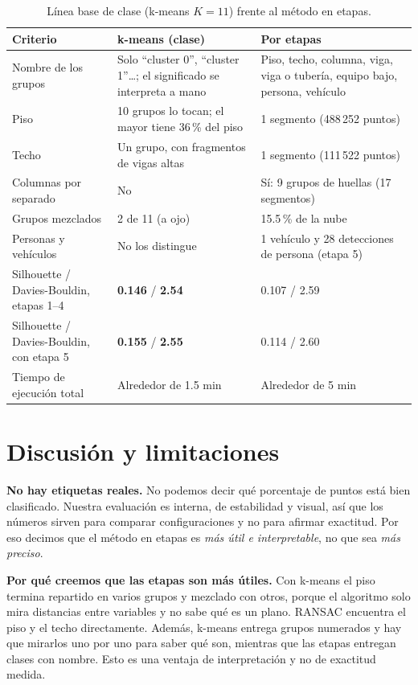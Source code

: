 \documentclass[10pt,a4paper]{article}
\begin{document}
\begin{table}[H]
\centering
\caption{Línea base de clase (k-means $K=11$) frente al método en etapas.}
\label{tab:comp}
\small
\begin{tabular}{p{3.6cm}p{5.4cm}p{5.4cm}}
\toprule
Criterio & k-means (clase) & Por etapas \\
\midrule
Nombre de los grupos & Solo ``cluster 0'', ``cluster 1''\ldots; el significado se interpreta a mano & Piso, techo, columna, viga, viga o tubería, equipo bajo, persona, vehículo \\
Piso & 10 grupos lo tocan; el mayor tiene 36\,\% del piso & 1 segmento (488\,252 puntos) \\
Techo & Un grupo, con fragmentos de vigas altas & 1 segmento (111\,522 puntos) \\
Columnas por separado & No & Sí: 9 grupos de huellas (17 segmentos) \\
Grupos mezclados & 2 de 11 (a ojo) & 15.5\,\% de la nube \\
Personas y vehículos & No los distingue & 1 vehículo y 28 detecciones de persona (etapa 5) \\
Silhouette / Davies-Bouldin, etapas 1--4 & \textbf{0.146} / \textbf{2.54} & 0.107 / 2.59 \\
Silhouette / Davies-Bouldin, con etapa 5 & \textbf{0.155} / \textbf{2.55} & 0.114 / 2.60 \\
Tiempo de ejecución total & Alrededor de 1.5 min & Alrededor de 5 min \\
\bottomrule
\end{tabular}
\end{table}

\FloatBarrier
\section{Discusión y limitaciones}
\textbf{No hay etiquetas reales.} No podemos decir qué porcentaje de puntos está bien
clasificado. Nuestra evaluación es interna, de estabilidad y visual, así que los números
sirven para comparar configuraciones y no para afirmar exactitud. Por eso decimos que el
método en etapas es \textit{más útil e interpretable}, no que sea \textit{más preciso}.

\textbf{Por qué creemos que las etapas son más útiles.} Con k-means el piso termina
repartido en varios grupos y mezclado con otros, porque el algoritmo solo mira distancias
entre variables y no sabe qué es un plano. RANSAC encuentra el piso y el techo directamente.
Además, k-means entrega grupos numerados y hay que mirarlos uno por uno para saber qué son,
mientras que las etapas entregan clases con nombre. Esto es una ventaja de interpretación
y no de exactitud medida.
\end{document}
